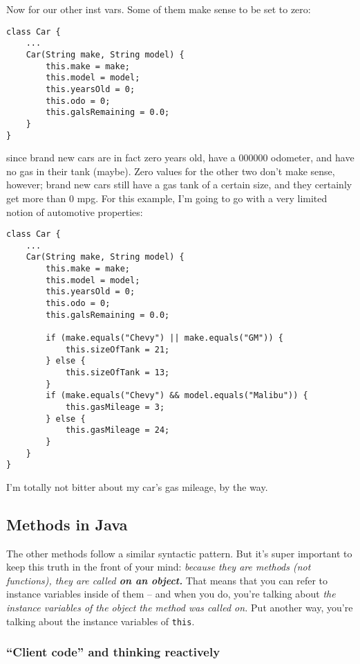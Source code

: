 Now for our other inst vars. Some of them make sense to be set to zero:

\begin{Verbatim}[samepage=true,fontsize=\scriptsize,frame=single]
class Car {
    ...
    Car(String make, String model) {
        this.make = make;
        this.model = model;
        this.yearsOld = 0;
        this.odo = 0;
        this.galsRemaining = 0.0;
    }
}
\end{Verbatim}

since brand new cars are in fact zero years old, have a 000000 odometer, and
have no gas in their tank (maybe). Zero values for the other two don't make
sense, however; brand new cars still have a gas tank of a certain size, and
they certainly get more than 0 mpg. For this example, I'm going to go with a
very limited notion of automotive properties:

\begin{Verbatim}[samepage=true,fontsize=\scriptsize,frame=single]
class Car {
    ...
    Car(String make, String model) {
        this.make = make;
        this.model = model;
        this.yearsOld = 0;
        this.odo = 0;
        this.galsRemaining = 0.0;
        
        if (make.equals("Chevy") || make.equals("GM")) {
            this.sizeOfTank = 21;
        } else {
            this.sizeOfTank = 13;
        }
        if (make.equals("Chevy") && model.equals("Malibu")) {
            this.gasMileage = 3;
        } else {
            this.gasMileage = 24;
        }
    }
}
\end{Verbatim}

I'm totally not bitter about my car's gas mileage, by the way.

\subsection{Methods in Java}

The other methods follow a similar syntactic pattern. But it's super important
to keep this truth in the front of your mind: \textit{because they are methods
(not functions), they are called \textbf{on an object.}} That means that
you can refer to instance variables inside of them -- and when you do, you're
talking about \textit{the instance variables of the object the method was
called on.} Put another way, you're talking about the instance variables of
\texttt{this}.

\subsubsection{``Client code'' and thinking reactively}

